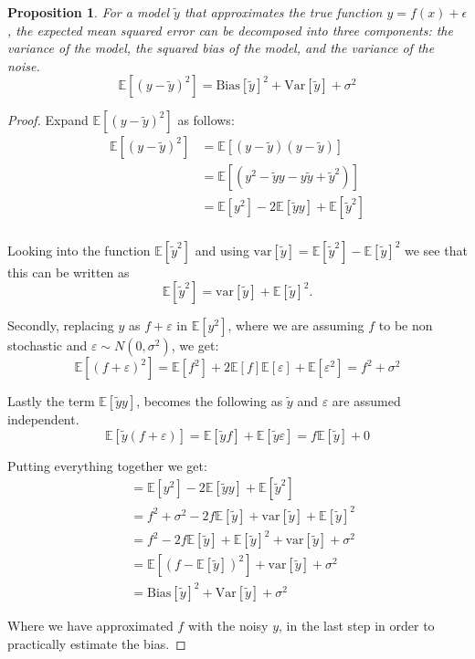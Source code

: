 \documentclass[twocolumn,aps]{revtex4}
\newtheorem{prop}{Proposition}[section]
\begin{document}
\begin{prop}
For a model $\tilde{y}$ that approximates the true function $y=f(x)+\epsilon$, the expected mean squared error can be decomposed into three components: the variance of the model, the squared bias of the model, and the variance of the noise.
$$\mathbb{E}[(y-\tilde{y})^2]=\mathrm{Bias}[\tilde{y}]^2+\mathrm{Var}[\tilde{y}]+\sigma^2$$
\label{prop:BiasVarianceDecomp}
\end{prop}

\begin{proof}

Expand $\mathbb{E}[(y-\tilde{y})^2]$ as follows:
\begin{align*}
\mathbb{E}[(y-\tilde{y})^2 ]&= \mathbb{E}[(y-\tilde{y}) (y-\tilde{y}) ] \\
&= \mathbb{E}[(y^2-\tilde{y} y -y \tilde{y} +\tilde{y}^2)] \\
&= \mathbb{E}[y^2] - 2 \mathbb{E}[\tilde{y} y] +\mathbb{E}[\tilde{y}^2] \\
\end{align*}

Looking into the function $\mathbb{E}[\tilde{y}^2]$ and using $\mathrm{var}[\tilde{y}] = \mathbb{E}[\tilde{y}^2] - \mathbb{E}[\tilde{y}]^2$ we see that this can be written as
$$
\mathbb{E}[\tilde{y}^2] = \mathrm{var}[\tilde{y}] + \mathbb{E}[\tilde{y}]^2.
$$

Secondly, replacing $y$ as $f + \varepsilon$ in $\mathbb{E}[y^2]$, where we are assuming $f$ to be non stochastic and $\varepsilon \sim N(0, \sigma^2)$, we get:
$$
\mathbb{E}[(f+\varepsilon)^2] = \mathbb{E}[f^2] + 2 \mathbb{E}[f]\mathbb{E}[\varepsilon] + \mathbb{E}[\varepsilon^2] =  f^2 + \sigma^2
$$

Lastly the term $\mathbb{E}[\tilde{y} y]$, becomes the following as $\tilde{y}$ and $\varepsilon$ are assumed independent.
$$
\mathbb{E}[\tilde{y} (f + \varepsilon)] = \mathbb{E}[\tilde{y} f] + \mathbb{E}[\tilde{y} \varepsilon] = f \mathbb{E}[\tilde{y}] + 0
$$

Putting everything together we get:
\begin{align*}
&=\mathbb{E}[y^2] - 2 \mathbb{E}[\tilde{y} y] +\mathbb{E}[\tilde{y}^2] \\
&= f^2 + \sigma^2 - 2 f \mathbb{E}[\tilde{y}] +\mathrm{var}[\tilde{y}] + \mathbb{E}[\tilde{y}]^2 \\
&= f^2 - 2 f \mathbb{E}[\tilde{y}] + \mathbb{E}[\tilde{y}]^2 + \mathrm{var}[\tilde{y}] + \sigma^2 \\
&= \mathbb{E}[ (f - \mathbb{E}[\tilde{y}])^2] + \mathrm{var}[\tilde{y}] + \sigma^2 \\
&= \mathrm{Bias}[\tilde{y}]^2  + \mathrm{Var}[\tilde{y}] + \sigma^2 \
\end{align*}

Where we have approximated $f$ with the noisy $y$, in the last step in order to practically estimate the bias.
\end{proof}
\end{document}
